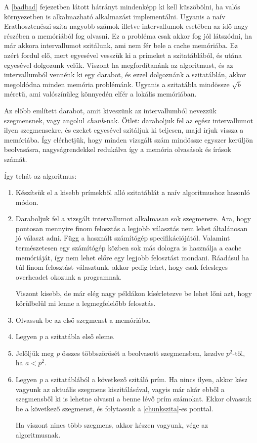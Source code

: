 \documentclass[twoside, a4paper, 12pt]{article}
\begin{document}
A \ref{badbad} fejezetben látott hátrányt mindenképp ki kell küszöbölni, ha valós környezetben is alkalmazható alkalmazást implementálni. Ugyanis a naív Erathosztenészi-szita nagyobb számok illetve intervallumok esetében az idő nagy részében a memóriából fog olvasni. Ez a probléma csak akkor fog jól látszódni, ha már akkora intervallumot szitálunk, ami nem fér bele a cache memóriába. Ez azért fordul elő, mert egyesével vesszük ki a prímeket a szitatáblából, és utána egyesével dolgozunk velük. Viszont ha megfordítanánk az algoritmust, és az intervallumból vennénk ki egy darabot, és ezzel dolgoznánk a szitatáblán, akkor megoldódna minden memória problémánk. Ugyanis a szitatábla mindössze $\sqrt{b}$ méretű, ami valószínűleg könnyedén elfér a lokális memóriában. \par 
Az előbb említett darabot, amit kiveszünk az intervallumból nevezzük szegmensnek, vagy angolul \textit{chunk}-nak. Ötlet: daraboljuk fel az egész intervallumot ilyen szegmensekre, és ezeket egyesével szitáljuk ki teljesen, majd írjuk vissza a memóriába. Így elérhetjük, hogy minden vizsgált szám mindössze egyszer kerüljön beolvasásra, nagyságrendekkel redukálva így a memória olvasások és írások számát. \par
Így tehát az algoritmus: \par
\begin{enumerate}
\item Készítsük el a kisebb prímekből alló szitatáblát a naív algoritmushoz hasonló módon.
\item Daraboljuk fel a vizsgált intervallumot alkalmasan sok szegmensre. Ara, hogy pontosan mennyire finom felosztás a legjobb választás nem lehet általánosan jó választ adni. Függ a használt számítógép specifikációjától. Valamint természetesen egy számítógép közben sok más dologra is használja a cache memóriáját, így nem lehet előre egy legjobb felosztást mondani. Ráadásul ha túl finom felosztást választunk, akkor pedig lehet, hogy csak felesleges overheadet okozunk a programnak. \par
Viszont kisebb, de már elég nagy példákon kísérletezve be lehet lőni azt, hogy körülbelül mi lenne a legmegfelelőbb felosztás.
\item Olvassuk be az első szegmenst a memóriába.
\item Legyen \textit{p} a szitatábla első eleme. \label{chunkszita}
\item Jelöljük meg \textit{p} összes többszörösét a beolvasott szegmensben, kezdve $p^2$-től, ha $a<p^2$.
\item Legyen \textit{p} a szitatáblából a következő szitáló prím. Ha nincs ilyen, akkor kész vagyunk az aktuális szegmens kiszitálásával, vagyis már akár ebből a szegmensből ki is lehetne olvasni a benne lévő prím számokat. Ekkor olvassuk be a következő szegmenst, és folytassuk a \ref{chunkszita}-es ponttal. \par
Ha viszont nincs több szegmens, akkor készen vagyunk, vége az algoritmusnak. 
\end{enumerate}
\end{document}
